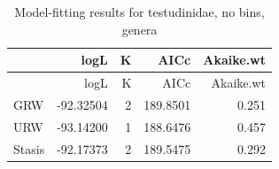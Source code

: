 \documentclass[]{article}
\begin{document}
\begin{longtable}[]{@{}lrrrr@{}}
\caption{Model-fitting results for testudinidae, no bins,
genera}\tabularnewline
\toprule
& logL & K & AICc & Akaike.wt\tabularnewline
\midrule
\endfirsthead
\toprule
& logL & K & AICc & Akaike.wt\tabularnewline
\midrule
\endhead
GRW & -92.32504 & 2 & 189.8501 & 0.251\tabularnewline
URW & -93.14200 & 1 & 188.6476 & 0.457\tabularnewline
Stasis & -92.17373 & 2 & 189.5475 & 0.292\tabularnewline
\bottomrule
\end{longtable}
\end{document}
